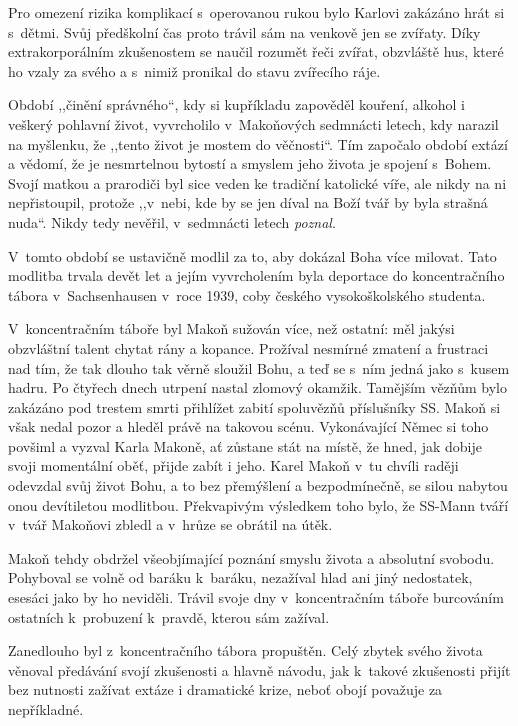 Pro omezení rizika komplikací s~operovanou rukou bylo Karlovi zakázáno hrát si
s~dětmi. Svůj předškolní čas proto trávil sám na venkově jen se zvířaty. Díky
extrakorporálním zkušenostem se naučil rozumět řeči zvířat, obzvláště hus, které
ho vzaly za svého a s~nimiž pronikal do stavu zvířecího ráje.

Období ,,činění správného``, kdy si kupříkladu zapověděl kouření, alkohol i
veškerý pohlavní život, vyvrcholilo v~Makoňových sedmnácti letech, kdy
narazil na myšlenku, že ,,tento život je mostem do věčnosti``. Tím započalo období
extází a vědomí, že je nesmrtelnou bytostí a smyslem jeho života je spojení
s~Bohem. Svojí matkou a prarodiči byl sice veden ke tradiční katolické víře, ale
nikdy na ni nepřistoupil, protože ,,v~nebi, kde by se jen díval na Boží tvář by
byla strašná nuda``. Nikdy tedy nevěřil, v~sedmnácti letech {\em poznal}.

V~tomto období se ustavičně modlil za to, aby dokázal Boha více milovat. Tato
modlitba trvala devět let a jejím vyvrcholením byla deportace do koncentračního
tábora v~Sachsenhausen v~roce 1939, coby českého vysokoškolského studenta.

V~koncentračním táboře byl Makoň sužován více, než ostatní: měl jakýsi
obzvláštní talent chytat rány a kopance. Prožíval nesmírné zmatení a frustraci
nad tím, že tak dlouho tak věrně sloužil Bohu, a teď se s~ním jedná jako s~kusem
hadru. Po čtyřech dnech utrpení nastal zlomový okamžik. Tamějším vězňům bylo
zakázáno pod trestem smrti přihlížet zabití spoluvězňů příslušníky SS. Makoň si
však nedal pozor a hleděl právě na takovou scénu. Vykonávající Němec si toho
povšiml a vyzval Karla Makoně, ať zůstane stát na místě, že hned, jak dobije
svoji momentální oběť, přijde zabít i jeho. Karel Makoň v~tu chvíli raději
odevzdal svůj život Bohu, a to bez přemýšlení a bezpodmínečně, se silou nabytou
onou devítiletou modlitbou. Překvapivým výsledkem toho bylo, že SS-Mann tváří
v~tvář Makoňovi zbledl a v~hrůze se obrátil na útěk.

Makoň tehdy obdržel všeobjímající poznání smyslu života
a absolutní svobodu. Pohyboval se volně od baráku k~baráku, nezažíval hlad ani
jiný nedostatek, esesáci jako by ho neviděli. Trávil svoje dny v~koncentračním táboře
burcováním ostatních k~probuzení k~pravdě, kterou sám zažíval.

Zanedlouho byl z~koncentračního tábora propuštěn. Celý zbytek svého života
věnoval předávání svojí zkušenosti a hlavně návodu, jak k~takové zkušenosti
přijít bez nutnosti zažívat extáze i dramatické krize, neboť obojí považuje za
nepříkladné.

